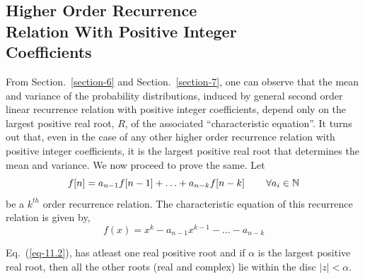 \begin{multicols}{2}
\section{Higher Order Recurrence\\ Relation With Positive Integer\\ Coefficients}\label{section-11}
From Section.~\ref{section-6} and Section.~\ref{section-7}, one can observe that the mean and variance of the probability distributions, induced by general second order linear recurrence relation with positive integer coefficients, depend only on the largest positive real root, $R$, of the associated ``characteristic equation''. It turns out that, even in the case of any other higher order recurrence relation with positive integer coefficients, it is the largest positive real root that determines the mean and variance. We now proceed to prove the same.
Let 
\begin{equation}
 f[n] = a_{n-1}f[n-1] + \ldots + a_{n-k}f[n-k] \hspace{0.3in} \forall a_i \in \mathbb{N}\label{eq-11.1}
\end{equation}
be a $k^{th}$ order recurrence relation. The characteristic equation of this recurrence relation is given by,
 \begin{equation}
    f(x) = x^k - a_{n-1}x^{k-1}- \ldots - a_{n-k}\label{eq-11.2}
 \end{equation}
 \setcounter{thm}{0}
\begin{lem}\label{lemma-11.1}
Eq.~(\ref{eq-11.2}), has atleast one real positive root and if $\alpha$ is the largest positive real root, then all the other roots (real and complex) lie within the disc $|z| < \alpha$.
\end{lem}


\end{multicols}
